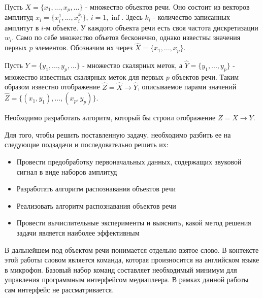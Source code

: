Пусть $X=\{x_1, ..., x_p, ...\}$ - множество объектов речи. Оно состоит из векторов амплитуд $x_i=\{x_i^1, ..., x_i^{k_i}\},~i=\overline{1,\inf}$. Здесь $k_i$ - количество записанных амплитут в $i$-м объекте. У каждого объекта речи есть своя частота дискретизации $w_i$. Само по себе множество объетов бесконечно, однако известны значения первых $p$ элементов. Обозначим их через $\widehat{X}=\{x_1, ..., x_p\}$.  

Пусть $Y=\{y_1, ..., y_p, ...\}$ - множество скалярных меток, а $\widehat{Y}=\{y_1, ..., y_p\}$ - множество известных скалярных меток для первых $p$ объектов речи. Таким образом известно отображение $\widehat{Z}=\widehat{X} \rightarrow \widehat{Y}$, описываемое парами значений $\widehat{Z}=\{(x_1, y_1), ..., (x_p, y_p)\}$.

Необходимо разработать алгоритм, который бы строил отображение $Z = X \rightarrow Y$.


Для того, чтобы решить поставленную задачу, необходимо разбить ее на следующие подзадачи и последовательно решить их:
\begin{itemize}[leftmargin=2cm]
\item Провести предобработку первоначальных данных, содержащих звуковой сигнал в виде наборов амплитуд
\item Разработать алгоритм распознавания объектов речи
\item Реализовать алгоритм распознавания объектов речи
\item Провести вычислительные эксперименты и выяснить, какой метод решения задачи является наиболее эффективным
\end{itemize}


В дальнейшем под объектом речи понимается отдельно взятое слово. В контексте этой работы словом является команда, которая произносится на английском языке в микрофон. Базовый набор команд составляет необходимый минимум для управления программным интерфейсом медиаплеера. В рамках данной работы сам интерфейс не рассматривается.